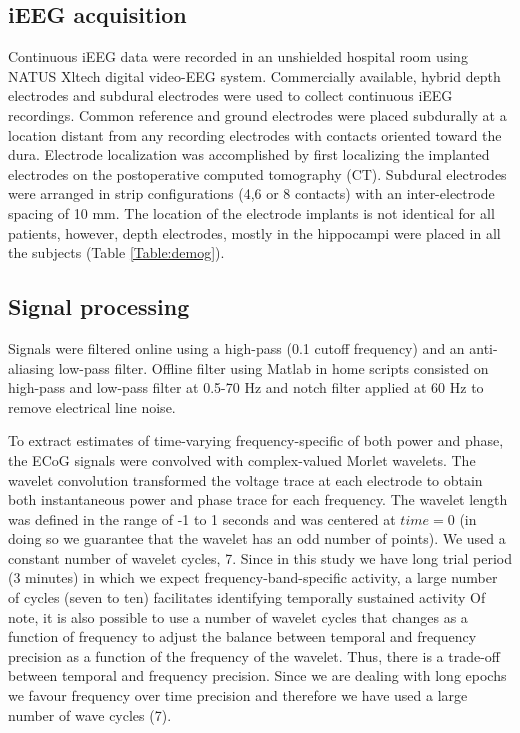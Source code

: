 \documentclass[11pt, onecolumn]{article}
\begin{document}
\subsection{iEEG acquisition}
Continuous iEEG data were recorded in an unshielded hospital room using NATUS Xltech digital video-EEG system.
Commercially available, hybrid depth electrodes and subdural electrodes were used to collect continuous iEEG recordings. Common reference and ground electrodes were placed subdurally at a location distant from any recording electrodes with contacts oriented toward the dura.
Electrode localization was accomplished by first localizing the implanted electrodes on the postoperative computed tomography (CT).
Subdural electrodes were arranged in strip configurations (4,6 or 8 contacts) with an inter-electrode spacing of 10 mm. The location of the electrode implants is not identical for all patients, however, depth electrodes, mostly in the hippocampi were placed in all the subjects (Table \ref{Table:demog}).

\subsection{Signal processing}
Signals were filtered online using a high-pass (0.1 cutoff frequency) and an anti-aliasing low-pass filter. %
Offline filter using Matlab in home scripts consisted on high-pass and low-pass filter at 0.5-70 Hz and notch filter applied at 60 Hz to remove electrical line noise.

To extract estimates of time-varying frequency-specific of both power and phase, the ECoG signals were convolved with complex-valued Morlet wavelets. %
The  wavelet convolution transformed the voltage trace at each electrode to obtain both instantaneous power and phase trace for each frequency.
The wavelet length was defined in the range of -1 to 1 seconds and was centered at $time = 0$ (in doing so we guarantee that the wavelet has an odd number of points). 
We used a constant number of wavelet cycles, 7. Since in this study we have long trial period (3 minutes) in which we expect frequency-band-specific activity, a large number of cycles (seven to ten) facilitates identifying temporally sustained activity \citep{cohen2014analyzing} Of note, it is also possible to use a number of wavelet cycles that changes as a function of frequency to adjust the balance between temporal and frequency precision as a function of the frequency of the wavelet. Thus, there is a trade-off between temporal and frequency precision. Since we are dealing with long epochs we favour frequency over time precision and therefore we have used a large number of wave cycles (7).
\end{document}
